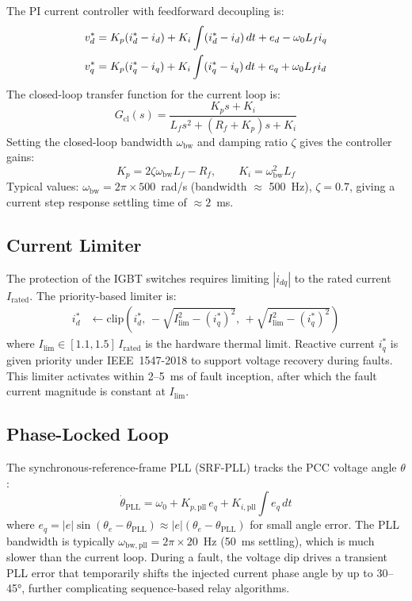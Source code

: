 The PI current controller with feedforward decoupling is:
\begin{align}
  v_d^\ast &= K_p(i_d^\ast - i_d) + K_i \int(i_d^\ast - i_d)\,dt
             + e_d - \omega_0 L_f i_q
  \label{eq:ch2_vd_ref} \\
  v_q^\ast &= K_p(i_q^\ast - i_q) + K_i \int(i_q^\ast - i_q)\,dt
             + e_q + \omega_0 L_f i_d
  \label{eq:ch2_vq_ref}
\end{align}
The closed-loop transfer function for the current loop is:
\begin{equation}
  G_\mathrm{cl}(s) = \frac{K_p s + K_i}{L_f s^2 + (R_f + K_p)s + K_i}
  \label{eq:ch2_gfl_tf}
\end{equation}
Setting the closed-loop bandwidth $\omega_\mathrm{bw}$ and damping ratio
$\zeta$ gives the controller gains:
\begin{equation}
  K_p = 2\zeta\omega_\mathrm{bw} L_f - R_f, \qquad
  K_i = \omega_\mathrm{bw}^2 L_f
  \label{eq:ch2_gains}
\end{equation}
Typical values: $\omega_\mathrm{bw} = 2\pi \times 500$~rad/s (bandwidth
$\approx$ 500~Hz), $\zeta = 0.7$, giving a current step response settling
time of $\approx 2$~ms.

\subsection{Current Limiter}

The protection of the IGBT switches requires limiting $|i_{dq}|$ to the
rated current $I_\mathrm{rated}$. The priority-based limiter is:
\begin{align}
  i_d^\ast &\leftarrow \mathrm{clip}\!\left(i_d^\ast,\,
             -\sqrt{I_\mathrm{lim}^2 - (i_q^\ast)^2},\,
             +\sqrt{I_\mathrm{lim}^2 - (i_q^\ast)^2}\right)
  \label{eq:ch2_ilim}
\end{align}
where $I_\mathrm{lim} \in [1.1, 1.5]\,I_\mathrm{rated}$ is the hardware
thermal limit. Reactive current $i_q^\ast$ is given priority under
IEEE~1547-2018 to support voltage recovery during faults. This limiter
activates within 2--5~ms of fault inception, after which the fault current
magnitude is constant at $I_\mathrm{lim}$.

\subsection{Phase-Locked Loop}

The synchronous-reference-frame PLL (SRF-PLL) tracks the PCC voltage
angle $\theta$:
\begin{equation}
  \dot{\theta}_\mathrm{PLL} = \omega_0 + K_{p,\mathrm{pll}}\,e_q
    + K_{i,\mathrm{pll}}\int e_q\,dt
  \label{eq:ch2_pll}
\end{equation}
where $e_q = |e|\sin(\theta_e - \theta_\mathrm{PLL}) \approx
|e|(\theta_e - \theta_\mathrm{PLL})$ for small angle error. The PLL
bandwidth is typically $\omega_\mathrm{bw,pll} = 2\pi \times 20$~Hz
(50~ms settling), which is much slower than the current loop. During a
fault, the voltage dip drives a transient PLL error that temporarily
shifts the injected current phase angle by up to 30--45°, further
complicating sequence-based relay algorithms.

